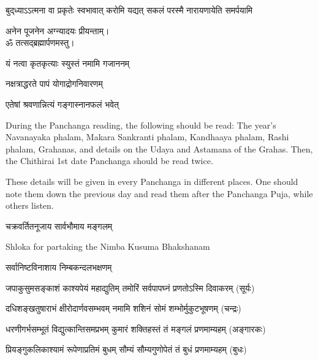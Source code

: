 {बुद्‌ध्याऽऽत्मना वा प्रकृतेः स्वभावात्}
{करोमि यद्यत् सकलं परस्मै}
{नारायणायेति समर्पयामि}

अनेन पूजनेन अग्न्यादयः प्रीयन्ताम्। \\

ॐ तत्सद्ब्रह्मार्पणमस्तु।


{यं नत्वा कृतकृत्याः स्युस्तं नमामि गजाननम्}

{नक्षत्राद्धरते पापं योगाद्रोगनिवारणम्}

{एतेषां श्रवणान्नित्यं गङ्गास्नानफलं भवेत्}

{\sffamily During the Panchanga reading, the following should be read:
The year’s Navanayaka phalam,
Makara Sankranti phalam,
Kandhaaya phalam,
Rashi phalam,
Grahanas, and
details on the Udaya and Astamana of the Grahas.
Then, the Chithirai 1st date Panchanga should be read twice.

\hspace{2ex} These details will be given in every Panchanga in different places. One should note them down the previous day and read them after the Panchanga Puja, while others listen.}


{चक्रवर्तितनूजाय सार्वभौमाय मङ्गलम्}

\closesection 


\centerline{\textsf{Shloka for partaking the Nimba Kusuma Bhakshanam}}

{सर्वानिष्टविनाशाय निम्बकन्दलभक्षणम्}



\twolineshloka
{जपाकुसुमसङ्काशं काश्यपेयं महाद्युतिम्}
{तमोरिं सर्वपापघ्नं प्रणतोऽस्मि दिवाकरम्}
\hfill (सूर्यः)

\twolineshloka
{दधिशङ्खतुषाराभं क्षीरोदार्णवसम्भवम्}
{नमामि शशिनं सोमं शम्भोर्मुकुटभूषणम्}
\hfill (चन्द्रः)

\twolineshloka
{धरणीगर्भसम्भूतं विद्युत्कान्तिसमप्रभम्}
{कुमारं शक्तिहस्तं तं मङ्गलं प्रणमाम्यहम्}
\hfill (अङ्गारकः)

\twolineshloka
{प्रियङ्गुकलिकाश्यामं रूपेणाप्रतिमं बुधम्}
{सौम्यं सौम्यगुणोपेतं तं बुधं प्रणमाम्यहम्}
\hfill (बुधः)


